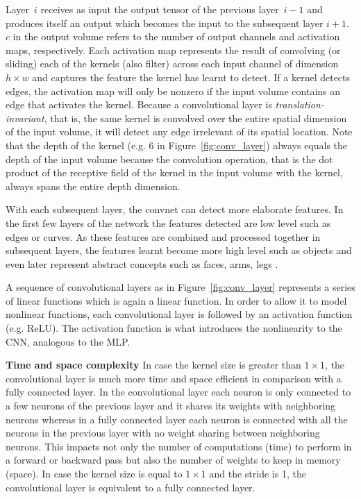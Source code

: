 \documentclass[a4paper,12pt]{report}
\begin{document}
Layer~$i$ receives as input the output tensor of the previous layer~$i-1$ and produces itself an output which becomes the input to the subsequent layer $i+1$. $c$ in the output volume refers to the number of output channels and activation maps, respectively. Each activation map represents the result of convolving (or sliding) each of the kernels (also filter) across each input channel of dimension $h \times w$ and captures the feature the kernel has learnt to detect. If a kernel detects edges, the activation map will only be nonzero if the input volume contains an edge that activates the kernel. Because a convolutional layer is \textit{translation-invariant}, that is, the same kernel is convolved over the entire spatial dimension of the input volume, it will detect any edge irrelevant of its spatial location. Note that the depth of the kernel (e.g. 6 in Figure~\ref{fig:conv_layer}) always equals the depth of the input volume because the convolution operation, that is the dot product of the receptive field of the kernel in the input volume with the kernel, always spans the entire depth dimension. 

With each subsequent layer, the convnet can detect more elaborate features. In the first few layers of the network the features detected are low level such as edges or curves. As these features are combined and processed together in subsequent layers, the features learnt become more high level such as objects and even later represent abstract concepts such as faces, arms, legs \cite{DeepVis}.

A sequence of convolutional layers as in Figure~\ref{fig:conv_layer} represents a series of linear functions which is again a linear function. In order to allow it to model nonlinear functions, each convolutional layer is followed by an activation function (e.g. ReLU). The activation function is what introduces the nonlinearity to the CNN, analogous to the MLP.

\textbf{Time and space complexity} In case the kernel size is greater than $1 \times 1$, the convolutional layer is much more time and space efficient in comparison with a fully connected layer. In the convolutional layer each neuron is only connected to a few neurons of the previous layer and it shares its weights with neighboring neurons whereas in a fully connected layer each neuron is connected with all the neurons in the previous layer with no weight sharing between neighboring neurons. This impacts not only the number of computations (time) to perform in a forward or backward pass but also the number of weights to keep in memory (space). In case the kernel size is equal to $1 \times 1$ and the stride is 1, the convolutional layer is equivalent to a fully connected layer.
\end{document}
